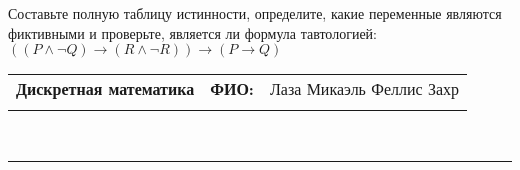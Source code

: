 \documentclass[10pt]{exam}
\newcommand{\class}{Дискретная математика}
\newcommand{\examdate}{}
\begin{document}
\begin{questions}
\begin{enumerate} [a)]
\end{enumerate}\question Составьте полную таблицу истинности, определите, какие переменные являются фиктивными и проверьте, является ли формула тавтологией:
$(( P \land \neg Q) \rightarrow (R \land \neg R)) \rightarrow (P \rightarrow Q)$

\end{questions}
\newpage
\begin{flushright}
\begin{tabular}{p{2.8in} r l}
\textbf{\class} & \textbf{ФИО:} &Лаза Микаэль Феллис Захр
\\

\textbf{\examdate} &&\\
\end{tabular}\\
\end{flushright}
\rule[1ex]{\textwidth}{.1pt}
\end{document}
